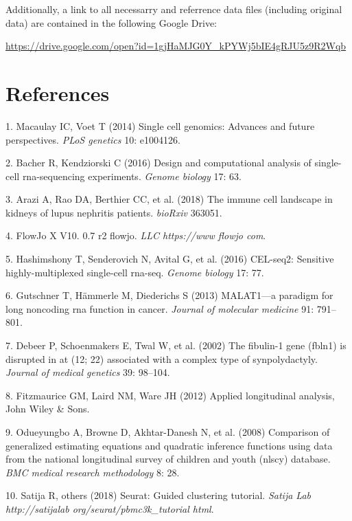 \documentclass[12pt,]{article}
\begin{document}
Additionally, a link to all necessarry and referrence data files
(including original data) are contained in the following Google Drive:

\url{https://drive.google.com/open?id=1gjHaMJG0Y_kPYWj5bIE4gRJU5z9R2Wqb}

\hypertarget{references}{%
\section{References}\label{references}}



\hypertarget{refs}{}
\leavevmode\hypertarget{ref-macaulay2014single}{}%
1. Macaulay IC, Voet T (2014) Single cell genomics: Advances and future
perspectives. \emph{PLoS genetics} 10: e1004126.

\leavevmode\hypertarget{ref-bacher2016design}{}%
2. Bacher R, Kendziorski C (2016) Design and computational analysis of
single-cell rna-sequencing experiments. \emph{Genome biology} 17: 63.

\leavevmode\hypertarget{ref-arazi2018immune}{}%
3. Arazi A, Rao DA, Berthier CC, et al. (2018) The immune cell landscape
in kidneys of lupus nephritis patients. \emph{bioRxiv} 363051.

\leavevmode\hypertarget{ref-flowjov10}{}%
4. FlowJo X V10. 0.7 r2 flowjo. \emph{LLC https://www flowjo com}.

\leavevmode\hypertarget{ref-hashimshony2016cel}{}%
5. Hashimshony T, Senderovich N, Avital G, et al. (2016) CEL-seq2:
Sensitive highly-multiplexed single-cell rna-seq. \emph{Genome biology}
17: 77.

\leavevmode\hypertarget{ref-gutschner2013malat1}{}%
6. Gutschner T, Hämmerle M, Diederichs S (2013) MALAT1---a paradigm for
long noncoding rna function in cancer. \emph{Journal of molecular
medicine} 91: 791--801.

\leavevmode\hypertarget{ref-debeer2002fibulin}{}%
7. Debeer P, Schoenmakers E, Twal W, et al. (2002) The fibulin-1 gene
(fbln1) is disrupted in at (12; 22) associated with a complex type of
synpolydactyly. \emph{Journal of medical genetics} 39: 98--104.

\leavevmode\hypertarget{ref-fitzmaurice2012applied}{}%
8. Fitzmaurice GM, Laird NM, Ware JH (2012) Applied longitudinal
analysis, John Wiley \& Sons.

\leavevmode\hypertarget{ref-odueyungbo2008comparison}{}%
9. Odueyungbo A, Browne D, Akhtar-Danesh N, et al. (2008) Comparison of
generalized estimating equations and quadratic inference functions using
data from the national longitudinal survey of children and youth (nlscy)
database. \emph{BMC medical research methodology} 8: 28.

\leavevmode\hypertarget{ref-satija2018seurat}{}%
10. Satija R, others (2018) Seurat: Guided clustering tutorial.
\emph{Satija Lab http://satijalab org/seurat/pbmc3k\_tutorial html}.
\end{document}
